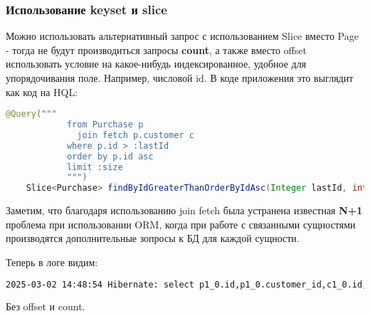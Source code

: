\subsubsection{Использование keyset и slice}\label{subsec:slicekeysetpagination}
Можно использовать альтернативный запрос с использованием Slice вместо Page - тогда не будут производиться запросы
\textbf{count}, а также вместо offset использовать условие на какое-нибудь индексированное, удобное для упорядочивания
поле.
Например, числовой id.
В коде приложения это выглядит как код на HQL:
\begin{lstlisting}[language=java, frame=single, basicstyle=\normalsize\ttfamily, breaklines=true,label={lst:hqlquery}]
    @Query("""
            from Purchase p
              join fetch p.customer c
            where p.id > :lastId
            order by p.id asc
            limit :size
            """)
    Slice<Purchase> findByIdGreaterThanOrderByIdAsc(Integer lastId, int size);
\end{lstlisting}
Заметим, что благодаря использованию join fetch была устранена известная \textbf{N+1} проблема при использовании ORM,
когда при работе с связанными сущностями производятся дополнительные зопросы к БД для каждой сущности.

Теперь в логе видим:
\begin{lstlisting}[language=bash, frame=single, basicstyle=\normalsize\ttfamily, breaklines=true,label={lst:hiberpagelog}]
2025-03-02 14:48:54 Hibernate: select p1_0.id,p1_0.customer_id,c1_0.id,c1_0.bonus_points,c1_0.email,c1_0.loyalty_status,c1_0.name,c1_0.phone,p1_0.purchase_date,p1_0.shop_id,p1_0.total_amount from business.purchase p1_0 join business.customer c1_0 on c1_0.id=p1_0.customer_id where p1_0.id>? order by p1_0.id fetch first ? rows only
\end{lstlisting}

Без offset и count.